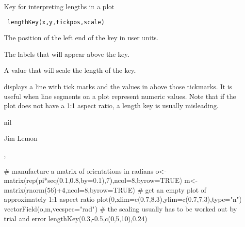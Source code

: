 \begin{Description}\relax
Key for interpreting lengths in a plot
\end{Description}
\begin{Usage}
\begin{verbatim}
 lengthKey(x,y,tickpos,scale)
\end{verbatim}
\end{Usage}
\begin{Arguments}
\begin{ldescription}
\item[\code{x,y}] The position of the left end of the key in user units.
\item[\code{tickpos}] The labels that will appear above the key.
\item[\code{scale}] A value that will scale the length of the key.
\end{ldescription}
\end{Arguments}
\begin{Details}\relax
{} displays a line with tick marks and the values in
 above those tickmarks. It is useful when line segments
on a plot represent numeric values. Note that if the plot does not have
a 1:1 aspect ratio, a length key is usually misleading.
\end{Details}
\begin{Value}
nil
\end{Value}
\begin{Author}\relax
Jim Lemon
\end{Author}
\begin{SeeAlso}\relax
{}, 
\end{SeeAlso}
\begin{Examples}
\begin{ExampleCode}
 # manufacture a matrix of orientations in radians
 o<-matrix(rep(pi*seq(0.1,0.8,by=0.1),7),ncol=8,byrow=TRUE)
 m<-matrix(rnorm(56)+4,ncol=8,byrow=TRUE)
 # get an empty plot of approximately 1:1 aspect ratio
 plot(0,xlim=c(0.7,8.3),ylim=c(0.7,7.3),type="n")
 vectorField(o,m,vecspec="rad")
 # the scaling usually has to be worked out by trial and error
 lengthKey(0.3,-0.5,c(0,5,10),0.24)
\end{ExampleCode}
\end{Examples}

